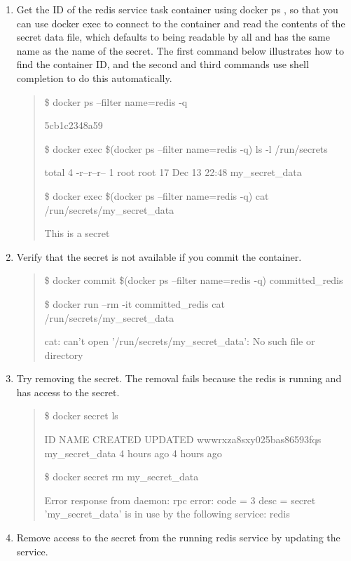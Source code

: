 \begin{enumerate}
\item
Get the ID of the redis service task container using docker ps , so that
you can use docker exec to connect to the container and read the contents
of the secret data file, which defaults to being readable by all and has
the same name as the name of the secret. The first command below
illustrates how to find the container ID, and the second and third commands
use shell completion to do this automatically.

\begin{quote}
\$ docker ps --filter name=redis -q

5cb1c2348a59

\$ docker exec \$(docker ps --filter name=redis -q) ls -l /run/secrets

total 4
-r--r--r--    1 root     root            17 Dec 13 22:48 my\_secret\_data

\$ docker exec \$(docker ps --filter name=redis -q) cat
/run/secrets/my\_secret\_data

This is a secret
\end{quote}

\item
Verify that the secret is not available if you commit the container.

\begin{quote}
\$ docker commit \$(docker ps --filter name=redis -q) committed\_redis

\$ docker run --rm -it committed\_redis cat /run/secrets/my\_secret\_data

cat: can't open '/run/secrets/my\_secret\_data': No such file or directory
\end{quote}

\item
Try removing the secret. The removal fails because the redis is running and
has access to the secret.

\begin{quote}
\$ docker secret ls

ID                          NAME                CREATED             UPDATED
wwwrxza8sxy025bas86593fqs   my\_secret\_data      4 hours ago         4 hours
ago


\$ docker secret rm my\_secret\_data

Error response from daemon: rpc error: code = 3 desc = secret
'my\_secret\_data' is in use by the following service: redis
\end{quote}

\item
Remove access to the secret from the running redis service by updating the
service.


\end{enumerate}
